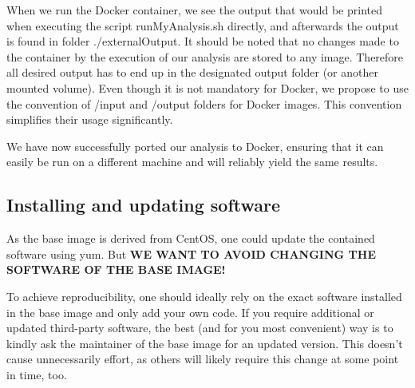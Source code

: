 \documentclass[a4paper, twoside, 11pt]{article}
\begin{document}
When we run the Docker container, we see the output that would be printed when 
executing the script runMyAnalysis.sh directly, and afterwards the output is found in folder ./externalOutput. 
It should be noted that no changes made to the container by the execution of our analysis 
are stored to any image. 
Therefore all desired output has to end up in the designated output folder (or another mounted volume). 
Even though it is not mandatory for Docker, 
we propose to use the convention of /input and /output folders for Docker images. 
This convention simplifies their usage significantly. 

We have now successfully ported our analysis to Docker, ensuring that it can easily be run  
on a different machine and will reliably yield the same results. 



\subsection{Installing and updating software}
\label{sec:installSoftware}
As the base image is derived from CentOS, one could update the contained software using yum. 
But \textbf{WE WANT TO AVOID CHANGING THE SOFTWARE OF THE BASE IMAGE!}

To achieve reproducibility, one should ideally rely on the exact software installed in the base image and only add your own code. 
If you require additional or updated third-party software, the best (and for you most convenient) way 
is to kindly ask the maintainer of the base image for an updated version. 
This doesn't cause unnecessarily effort, 
as others will likely require this change at some point in time, too. 
\end{document}
